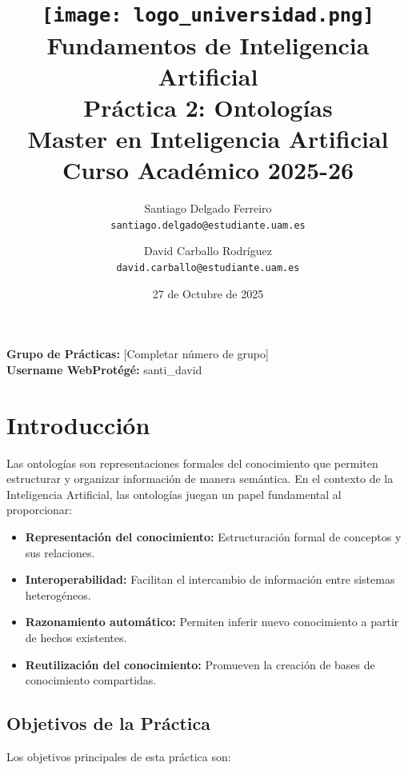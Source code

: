 \documentclass[12pt,a4paper]{article}
\title{
    \vspace{-2cm}
    \texttt{[image: logo\_universidad.png]}\\ %
    \vspace{1cm}
    \textbf{Fundamentos de Inteligencia Artificial}\\
    \Large Práctica 2: Ontologías\\
    \large Master en Inteligencia Artificial\\
    \normalsize Curso Académico 2025-26
}
\author{
    Santiago Delgado Ferreiro\\
    \texttt{santiago.delgado@estudiante.uam.es}
    \and
    David Carballo Rodríguez\\
    \texttt{david.carballo@estudiante.uam.es}
}
\date{27 de Octubre de 2025}
\begin{document}
\maketitle
\thispagestyle{empty}

\vfill

\begin{center}
\textbf{Grupo de Prácticas:} [Completar número de grupo]\\
\vspace{0.5cm}
\textbf{Username WebProtégé:} santi\_david
\end{center}

\newpage

\tableofcontents
\newpage

\setcounter{page}{1}

\section{Introducción}

Las ontologías son representaciones formales del conocimiento que permiten estructurar y organizar información de manera semántica. En el contexto de la Inteligencia Artificial, las ontologías juegan un papel fundamental al proporcionar:

\begin{itemize}
    \item \textbf{Representación del conocimiento:} Estructuración formal de conceptos y sus relaciones.
    \item \textbf{Interoperabilidad:} Facilitan el intercambio de información entre sistemas heterogéneos.
    \item \textbf{Razonamiento automático:} Permiten inferir nuevo conocimiento a partir de hechos existentes.
    \item \textbf{Reutilización del conocimiento:} Promueven la creación de bases de conocimiento compartidas.
\end{itemize}

\subsection{Objetivos de la Práctica}

Los objetivos principales de esta práctica son:
\end{document}
